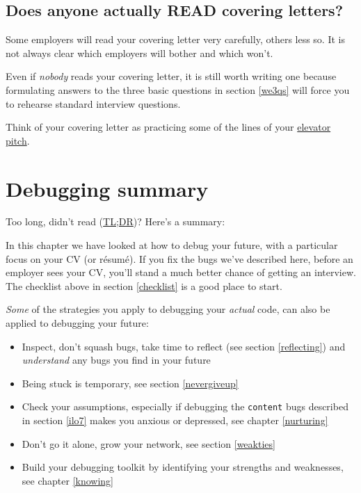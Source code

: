 \documentclass[
]{book}
\providecommand{\tightlist}{%
  \setlength{\itemsep}{0pt}\setlength{\parskip}{0pt}}
\begin{document}
\hypertarget{elevatorpitch}{%
\subsection{Does anyone actually READ covering letters?}\label{elevatorpitch}}

Some employers will read your covering letter very carefully, others less so. It is not always clear which employers will bother and which won't.

Even if \emph{nobody} reads your covering letter, it is still worth writing one because formulating answers to the three basic questions in section \ref{we3qs} will force you to rehearse standard interview questions.

Think of your covering letter as practicing some of the lines of your \href{https://en.wikipedia.org/wiki/Elevator_pitch}{elevator pitch}.

\hypertarget{tldr7}{%
\section{Debugging summary}\label{tldr7}}

Too long, didn't read (\href{https://en.wiktionary.org/wiki/too_long;_didn\%27t_read}{TL;DR})? Here's a summary:

In this chapter we have looked at how to debug your future, with a particular focus on your CV (or résumé). If you fix the bugs we've described here, before an employer sees your CV, you'll stand a much better chance of getting an interview. The checklist above in section \ref{checklist} is a good place to start.

\emph{Some} of the strategies you apply to debugging your \emph{actual} code, can also be applied to debugging your future:

\begin{itemize}
\tightlist
\item
  Inspect, don't squash bugs, take time to reflect (see section \ref{reflecting}) and \emph{understand} any bugs you find in your future
\item
  Being stuck is temporary, see section \ref{nevergiveup}
\item
  Check your assumptions, especially if debugging the \texttt{content} bugs described in section \ref{ilo7} makes you anxious or depressed, see chapter \ref{nurturing}
\item
  Don't go it alone, grow your network, see section \ref{weakties}
\item
  Build your debugging toolkit by identifying your strengths and weaknesses, see chapter \ref{knowing}
\end{itemize}
\end{document}
